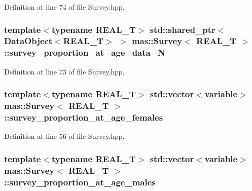 Definition at line 74 of file Survey.\-hpp.

\hypertarget{structmas_1_1_survey_a5f29ffd1fbe8b5038854a1fce1204d04}{
\subsubsection[{survey\-\_\-proportion\-\_\-at\-\_\-age\-\_\-data\-\_\-\-N}]{\setlength{\rightskip}{0pt plus 5cm}template$<$typename R\-E\-A\-L\-\_\-\-T$>$ std\-::shared\-\_\-ptr$<${\bf Data\-Object}$<$R\-E\-A\-L\-\_\-\-T$>$ $>$ {\bf mas\-::\-Survey}$<$ R\-E\-A\-L\-\_\-\-T $>$\-::survey\-\_\-proportion\-\_\-at\-\_\-age\-\_\-data\-\_\-\-N}}\label{structmas_1_1_survey_a5f29ffd1fbe8b5038854a1fce1204d04}


Definition at line 73 of file Survey.\-hpp.

\hypertarget{structmas_1_1_survey_a8e55c1393d70b3354b7670ed20065af4}{
\subsubsection[{survey\-\_\-proportion\-\_\-at\-\_\-age\-\_\-females}]{\setlength{\rightskip}{0pt plus 5cm}template$<$typename R\-E\-A\-L\-\_\-\-T$>$ std\-::vector$<${\bf variable}$>$ {\bf mas\-::\-Survey}$<$ R\-E\-A\-L\-\_\-\-T $>$\-::survey\-\_\-proportion\-\_\-at\-\_\-age\-\_\-females}}\label{structmas_1_1_survey_a8e55c1393d70b3354b7670ed20065af4}


Definition at line 56 of file Survey.\-hpp.

\hypertarget{structmas_1_1_survey_ab22021d23ed4557342ebf3af305e95b6}{
\subsubsection[{survey\-\_\-proportion\-\_\-at\-\_\-age\-\_\-males}]{\setlength{\rightskip}{0pt plus 5cm}template$<$typename R\-E\-A\-L\-\_\-\-T$>$ std\-::vector$<${\bf variable}$>$ {\bf mas\-::\-Survey}$<$ R\-E\-A\-L\-\_\-\-T $>$\-::survey\-\_\-proportion\-\_\-at\-\_\-age\-\_\-males}}\label{structmas_1_1_survey_ab22021d23ed4557342ebf3af305e95b6}


